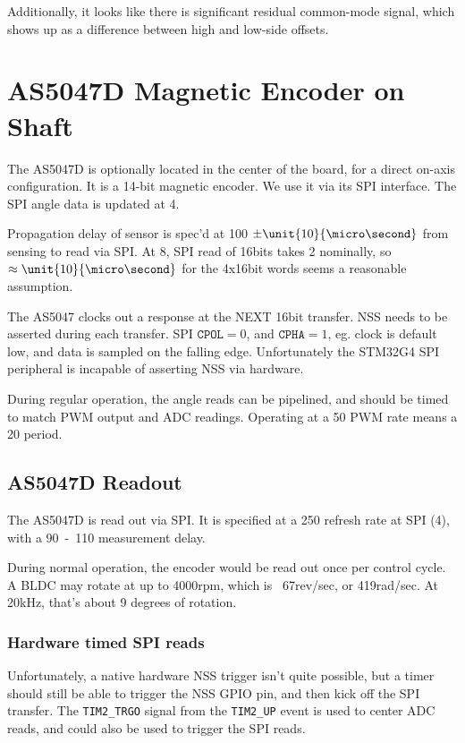\documentclass[12pt,a4paper,oneside,openany]{article}
\begin{document}
Additionally, it looks like there is significant residual common-mode signal, which shows up as a difference between high and low-side offsets.

\section{AS5047D Magnetic Encoder on Shaft}

The AS5047D is optionally located in the center of the board, for a direct on-axis configuration. It is a 14-bit magnetic encoder. We use it via its SPI interface. The SPI angle data is updated at \unit{4}{\mega\hertz}.

Propagation delay of sensor is spec'd at \unit{100}{\micro\second} $\pm\unit{10}{\micro\second}$ from sensing to read via SPI. At \unit{8}{\mega\hertz}, SPI read of 16bits takes \unit{2}{\micro\second} nominally, so $\approx\unit{10}{\micro\second}$ for the 4x16bit words seems a reasonable assumption.

The AS5047 clocks out a response at the NEXT 16bit transfer. NSS needs to be asserted during each transfer. SPI $\texttt{CPOL}=0$, and $\texttt{CPHA}=1$, eg. clock is default low, and data is sampled on the falling edge. Unfortunately the STM32G4 SPI peripheral is incapable of asserting NSS via hardware. 

During regular operation, the angle reads can be pipelined, and should be timed to match PWM output and ADC readings. Operating at a \unit{50}{\kilo\hertz} PWM rate means a \unit{20}{\micro\second} period. 


\subsection{AS5047D Readout}

The AS5047D is read out via SPI. It is specified at a \unit{250}{\nano\second} refresh rate at SPI (\unit{4}{\mega\hertz}), with a \unit{90-110}{\micro\second} measurement delay. 

During normal operation, the encoder would be read out once per control cycle. A BLDC may rotate at up to 4000rpm, which is ~67rev/sec, or 419rad/sec. At 20kHz, that's about 9 degrees of rotation.

\subsubsection{Hardware timed SPI reads}

Unfortunately, a native hardware NSS trigger isn't quite possible, but a timer should still be able to trigger the NSS GPIO pin, and then kick off the SPI transfer. The \texttt{TIM2\_TRGO} signal from the \texttt{TIM2\_UP} event is used to center ADC reads, and could also be used to trigger the SPI reads.
\end{document}
